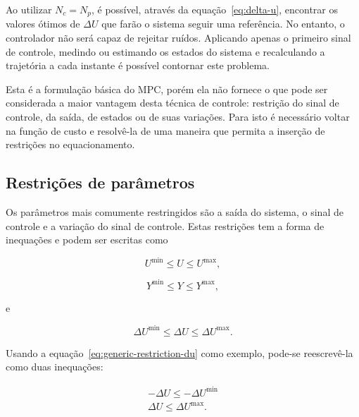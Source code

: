 Ao utilizar \( N_c = N_p \), é possível, através da equação~\eqref{eq:delta-u},
encontrar os valores ótimos de \( \Delta{}U \) que farão o sistema seguir uma
referência. No entanto, o controlador não será capaz de rejeitar ruídos.
Aplicando apenas o primeiro sinal de controle, medindo ou estimando os estados
do sistema e recalculando a trajetória a cada instante é possível contornar este
problema.

Esta é a formulação básica do MPC, porém ela não fornece o que pode ser
considerada a maior vantagem desta técnica de controle: restrição do sinal de
controle, da saída, de estados ou de suas variações. Para isto é necessário
voltar na função de custo e resolvê-la de uma maneira que permita a inserção
de restrições no equacionamento.

\pagebreak

\subsection{Restrições de parâmetros}%
\label{subsec:mpc-restricted}

Os parâmetros mais comumente restringidos são a saída do sistema, o sinal de
controle e a variação do sinal de controle. Estas restrições tem a forma de
inequações e podem ser escritas como

\begin{equation}
	\label{eq:generic-restriction-u}
	U^{\min} \le U \le U^{\max},
\end{equation}

\begin{equation}
	\label{eq:generic-restriction-y}
	Y^{\min} \le Y \le Y^{\max},
\end{equation}

e

\begin{equation}
	\label{eq:generic-restriction-du}
	\Delta{}U^{\min} \le \Delta{}U \le \Delta{}U^{\max}.
\end{equation}

Usando a equação~\eqref{eq:generic-restriction-du} como exemplo, pode-se
reescrevê-la como duas inequações:

\begin{equation}
	\label{eq:generic-restriction-du-two-eq}
	\begin{split}
		-\Delta{}U \le -\Delta{}U^{\min} \\
		\Delta{}U \le \Delta{}U^{\max}.
	\end{split}
\end{equation}

